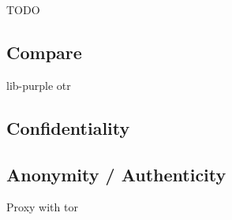 
TODO

\subsection{Compare}
lib-purple otr

\subsection{Confidentiality}

\subsection{Anonymity / Authenticity}
Proxy with tor

